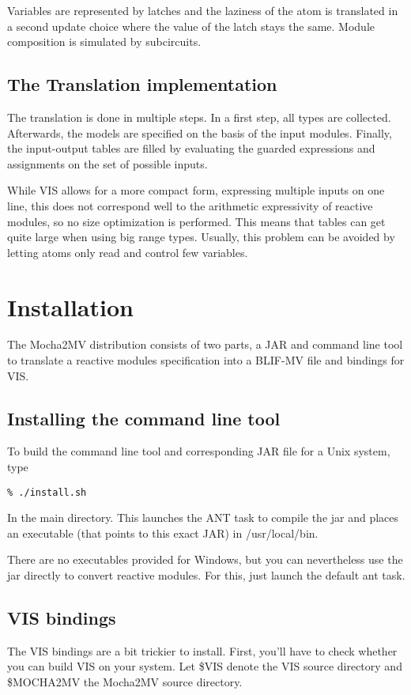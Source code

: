 \documentclass[a4paper,12pt]{article}
\begin{document}
Variables are represented by latches and the laziness of the atom is
translated in a second update choice where the value of the latch stays
the same. Module composition is simulated by subcircuits.

\subsection{The Translation implementation}
The translation is done in multiple steps. In a first step, all types
are collected. Afterwards, the models are specified on the basis of the
input modules. Finally, the input-output tables are filled by evaluating
the guarded expressions and assignments on the set of possible inputs.

While VIS allows for a more compact form, expressing multiple inputs on
one line, this does not correspond well to the arithmetic expressivity
of reactive modules, so no size optimization is performed. This means
that tables can get quite large when using big range types. Usually,
this problem can be avoided by letting atoms only read and control few
variables.

\section{Installation}
The Mocha2MV distribution consists of two parts, a JAR and
command line tool to translate a reactive modules specification
into a BLIF-MV file and bindings for VIS.

\subsection{Installing the command line tool}
To build the command line tool and corresponding JAR file for
a Unix system, type

\begin{verbatim}
% ./install.sh
\end{verbatim}

In the main directory. This launches the ANT task to compile the
jar and places an executable (that points to this exact JAR) in
/usr/local/bin.

There are no executables provided for Windows, but you can nevertheless
use the jar directly to convert reactive modules. For this, just launch
the default ant task.

\subsection{VIS bindings}
The VIS bindings are a bit trickier to install. First, you'll have
to check whether you can build VIS on your system. Let \$VIS denote
the VIS source directory and \$MOCHA2MV the Mocha2MV source directory.
\end{document}
